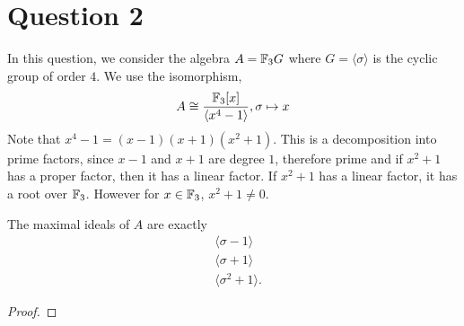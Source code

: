 \documentclass{unswmaths}
\begin{document}
\section*{Question 2}
In this question, we consider the algebra $A = \mathbb{F}_3 G$ where $G = \langle \sigma\rangle$
is the cyclic group of order $4$. We use the isomorphism,
\begin{equation*}
    A\cong \frac{\mathbb{F}_3[x]}{\langle x^4-1\rangle}, \sigma\mapsto x
\end{equation*}
Note that $x^4-1 = (x-1)(x+1)(x^2+1)$. This is a decomposition into prime factors,
since $x-1$ and $x+1$ are degree $1$, therefore prime and if $x^2+1$ has a proper factor,
then it has a linear factor. If $x^2+1$ has a linear factor, it has a root over $\mathbb{F}_3$. However
for $x \in \mathbb{F}_3$, $x^2+1\neq 0$.

\begin{lemma}
    The maximal ideals of $A$ are exactly
    \begin{align*}
        &\langle \sigma-1\rangle\\
        &\langle \sigma+1\rangle\\
        &\langle \sigma^2+1\rangle.
    \end{align*}
\end{lemma}
\begin{proof}
    
\end{proof}

    
\end{document}
